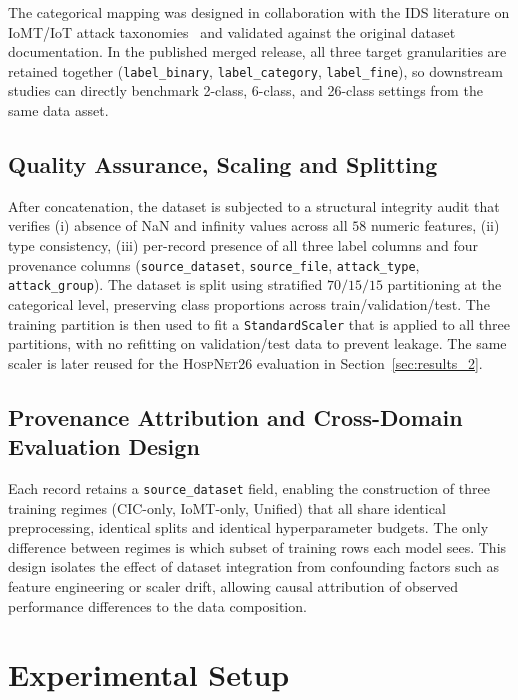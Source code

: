 \documentclass[runningheads]{llncs}
\begin{document}
The categorical mapping was designed in collaboration with the IDS literature on IoMT/IoT attack taxonomies~\cite{khraisat2019survey,heidari2023iot} and validated against the original dataset documentation.
In the published merged release, all three target granularities are retained together (\texttt{label\_binary}, \texttt{label\_category}, \texttt{label\_fine}), so downstream studies can directly benchmark 2-class, 6-class, and 26-class settings from the same data asset.

\subsection{Quality Assurance, Scaling and Splitting}

After concatenation, the dataset is subjected to a structural integrity audit that verifies (i) absence of NaN and infinity values across all $58$ numeric features, (ii) type consistency, (iii) per-record presence of all three label columns and four provenance columns (\texttt{source\_dataset}, \texttt{source\_file}, \texttt{attack\_type}, \texttt{attack\_group}). The dataset is split using stratified $70/15/15$ partitioning at the categorical level, preserving class proportions across train/validation/test. The training partition is then used to fit a \texttt{StandardScaler} that is applied to all three partitions, with no refitting on validation/test data to prevent leakage. The same scaler is later reused for the \textsc{HospNet26} evaluation in Section~\ref{sec:results_2}.

\subsection{Provenance Attribution and Cross-Domain Evaluation Design}

Each record retains a \texttt{source\_dataset} field, enabling the construction of three training regimes (CIC-only, IoMT-only, Unified) that all share identical preprocessing, identical splits and identical hyperparameter budgets. The only difference between regimes is which subset of training rows each model sees. This design isolates the effect of dataset integration from confounding factors such as feature engineering or scaler drift, allowing causal attribution of observed performance differences to the data composition.

\section{Experimental Setup}
\label{sec:setup}
\end{document}
